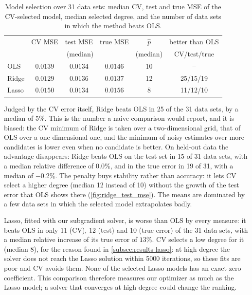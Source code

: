 \begin{table}[htbp]
    \centering
    \caption{Model selection over 31 data sets: median CV, test and true MSE of
    the CV-selected model, median selected degree, and the number of data sets
    in which the method beats OLS.}
    \label{tab:final}
    {\footnotesize\setlength{\tabcolsep}{4pt}
    \begin{tabular}{@{}lccccc@{}}
        \toprule
        & CV MSE & test MSE & true MSE & $\hat p$ & better than OLS \\
        & \multicolumn{3}{c}{(median)} & (median) & CV/test/true \\
        \midrule
        OLS & $0.0139$ & $0.0134$ & $0.0146$ & 10 & -- \\
        Ridge & $0.0129$ & $0.0136$ & $0.0137$ & 12 & 25/15/19 \\
        Lasso & $0.0150$ & $0.0134$ & $0.0156$ & 8 & 11/12/10 \\
        \bottomrule
    \end{tabular}}
\end{table}

Judged by the CV error itself, Ridge beats OLS in 25 of the 31 data sets, by a
median of $5\%$. This is the number a naive comparison would report, and it is
biased: the CV minimum of Ridge is taken over a two-dimensional grid, that of
OLS over a one-dimensional one, and the minimum of noisy estimates over more
candidates is lower even when no candidate is better. On held-out data the
advantage disappears: Ridge beats OLS on the test set in 15 of 31 data sets,
with a median relative difference of $0.0\%$, and in the true error in 19 of
31, with a median of $-0.2\%$. The penalty buys stability rather than
accuracy: it lets CV select a higher degree (median 12 instead of 10)
without the growth of the test error that OLS shows there
(\cref{fig:ridge_test_mse}). The means are dominated by a few
data sets in which the selected model extrapolates badly.

Lasso, fitted with our subgradient solver, is worse than OLS by every measure:
it beats OLS in only 11 (CV), 12 (test) and 10 (true error) of the 31 data sets,
with a median relative increase of its true error of $13\%$. CV selects a low degree for it
(median 8), for the reason found in \cref{subsec:results-lasso}: at high degree
the solver does not reach the Lasso solution within 5000 iterations, so these
fits are poor and CV avoids them. None of the selected Lasso models has an exact
zero coefficient. This comparison therefore measures our optimizer as much as
the Lasso model; a solver that converges at high degree could change the
ranking.


